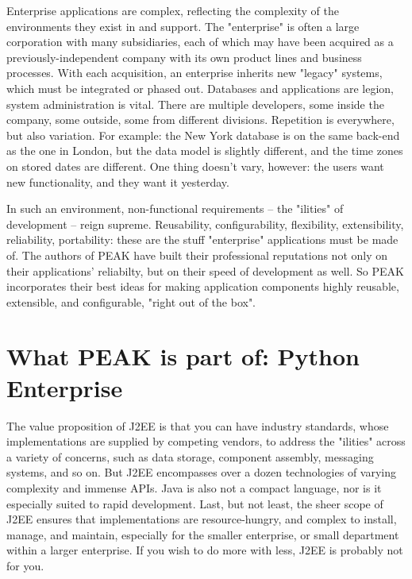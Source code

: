 Enterprise applications are complex, reflecting the complexity of the
environments they exist in and support. The "enterprise" is often a
large corporation with many subsidiaries, each of which may have been
acquired as a previously-independent company with its own product lines
and business processes. With each acquisition, an enterprise inherits
new "legacy" systems, which must be integrated or phased out. Databases
and applications are legion, system administration is vital. There are
multiple developers, some inside the company, some outside, some from
different divisions. Repetition is everywhere, but also variation. For
example: the New York database is on the same back-end as the one in
London, but the data model is slightly different, and the time zones on
stored dates are different. One thing doesn't vary, however: the users
want new functionality, and they want it yesterday. 

In such an environment, non-functional requirements -- the "ilities" of
development -- reign supreme. Reusability, configurability, flexibility,
extensibility, reliability, portability: these are the stuff
"enterprise" applications must be made of. The authors of PEAK have
built their professional reputations not only on their applications'
reliabilty, but on their speed of development as well. So PEAK
incorporates their best ideas for making application components highly
reusable, extensible, and configurable, "right out of the box". 

















\section{What PEAK is part of: Python Enterprise} 

The value proposition of J2EE is that you can have industry standards,
whose implementations are supplied by competing vendors, to address
the "ilities" across a variety of concerns, such as data storage,
component assembly, messaging systems, and so on.  But J2EE encompasses
over a dozen technologies of varying complexity and immense APIs.  Java
is also not a compact language, nor is it especially suited to rapid
development.  Last, but not least, the sheer scope of J2EE ensures that
implementations are resource-hungry, and complex to install, manage, and
maintain, especially for the smaller enterprise, or small department
within a larger enterprise.  If you wish to do more with less, J2EE is
probably not for you. 


